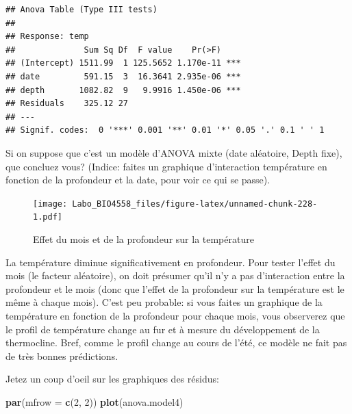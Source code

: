 \documentclass[
  12pt,
]{book}
\newenvironment{Shaded}{\begin{snugshade}}{\end{snugshade}}
\newcommand{\DataTypeTok}[1]{\textcolor[rgb]{0.13,0.29,0.53}{#1}}
\newcommand{\DecValTok}[1]{\textcolor[rgb]{0.00,0.00,0.81}{#1}}
\newcommand{\KeywordTok}[1]{\textcolor[rgb]{0.13,0.29,0.53}{\textbf{#1}}}
\newcommand{\NormalTok}[1]{#1}
\newcommand{\OperatorTok}[1]{\textcolor[rgb]{0.81,0.36,0.00}{\textbf{#1}}}
\begin{document}
\begin{verbatim}
## Anova Table (Type III tests)
## 
## Response: temp
##              Sum Sq Df  F value    Pr(>F)    
## (Intercept) 1511.99  1 125.5652 1.170e-11 ***
## date         591.15  3  16.3641 2.935e-06 ***
## depth       1082.82  9   9.9916 1.450e-06 ***
## Residuals    325.12 27                       
## ---
## Signif. codes:  0 '***' 0.001 '**' 0.01 '*' 0.05 '.' 0.1 ' ' 1
\end{verbatim}

Si on suppose que c'est un modèle d'ANOVA mixte (date aléatoire, Depth fixe), que concluez vous? (Indice: faites un graphique d'interaction température en fonction de la profondeur et la date, pour voir ce qui se passe).

\begin{Shaded}
\end{Shaded}

\begin{figure}
\centering
\texttt{[image: Labo\_BIO4558\_files/figure-latex/unnamed-chunk-228-1.pdf]}
\caption{\label{fig:unnamed-chunk-228}Effet du mois et de la profondeur sur la température}
\end{figure}

La température diminue significativement en profondeur. Pour tester l'effet du mois (le facteur aléatoire), on doit présumer qu'il n'y a pas d'interaction entre la profondeur et le mois (donc que l'effet de la profondeur sur la température est le même à chaque mois). C'est peu probable: si vous faites un graphique de la température en fonction de la profondeur pour chaque mois, vous observerez que le profil de température change au fur et à mesure du développement de la thermocline. Bref, comme le profil change au cours de l'été, ce modèle ne fait pas de très bonnes prédictions.

Jetez un coup d'oeil sur les graphiques des résidus:

\begin{Shaded}
\begin{Highlighting}[]
\KeywordTok{par}\NormalTok{(}\DataTypeTok{mfrow =} \KeywordTok{c}\NormalTok{(}\DecValTok{2}\NormalTok{, }\DecValTok{2}\NormalTok{))}
\KeywordTok{plot}\NormalTok{(anova.model4)}
\end{Highlighting}
\end{Shaded}
\end{document}
